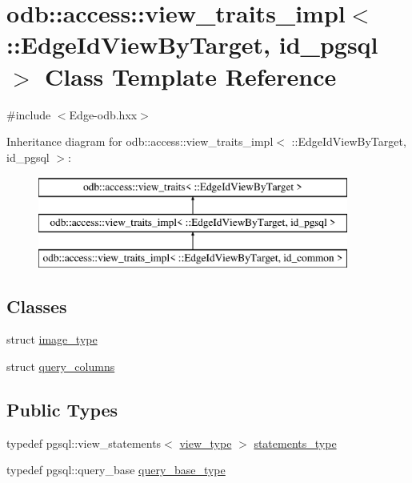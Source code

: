 \hypertarget{classodb_1_1access_1_1view__traits__impl_3_01_1_1_edge_id_view_by_target_00_01id__pgsql_01_4}{}\section{odb\+:\+:access\+:\+:view\+\_\+traits\+\_\+impl$<$ \+:\+:Edge\+Id\+View\+By\+Target, id\+\_\+pgsql $>$ Class Template Reference}
\label{classodb_1_1access_1_1view__traits__impl_3_01_1_1_edge_id_view_by_target_00_01id__pgsql_01_4}


{\ttfamily \#include $<$Edge-\/odb.\+hxx$>$}

Inheritance diagram for odb\+:\+:access\+:\+:view\+\_\+traits\+\_\+impl$<$ \+:\+:Edge\+Id\+View\+By\+Target, id\+\_\+pgsql $>$\+:\begin{figure}[H]
\begin{center}
\leavevmode
\includegraphics[height=3.000000cm]{d0/d63/classodb_1_1access_1_1view__traits__impl_3_01_1_1_edge_id_view_by_target_00_01id__pgsql_01_4}
\end{center}
\end{figure}
\subsection*{Classes}
\begin{DoxyCompactItemize}
\item 
struct \hyperlink{structodb_1_1access_1_1view__traits__impl_3_01_1_1_edge_id_view_by_target_00_01id__pgsql_01_4_1_1image__type}{image\+\_\+type}
\item 
struct \hyperlink{structodb_1_1access_1_1view__traits__impl_3_01_1_1_edge_id_view_by_target_00_01id__pgsql_01_4_1_1query__columns}{query\+\_\+columns}
\end{DoxyCompactItemize}
\subsection*{Public Types}
\begin{DoxyCompactItemize}
\item 
typedef pgsql\+::view\+\_\+statements$<$ \hyperlink{classodb_1_1access_1_1view__traits_3_01_1_1_edge_id_view_by_target_01_4_a9f04db81fe2177f9be477b512f390b40}{view\+\_\+type} $>$ \hyperlink{classodb_1_1access_1_1view__traits__impl_3_01_1_1_edge_id_view_by_target_00_01id__pgsql_01_4_a2bb409f4a06c6a8bb714bfd9001b6737}{statements\+\_\+type}
\item 
typedef pgsql\+::query\+\_\+base \hyperlink{classodb_1_1access_1_1view__traits__impl_3_01_1_1_edge_id_view_by_target_00_01id__pgsql_01_4_a44eb78f133d084693b0fa0aeef785887}{query\+\_\+base\+\_\+type}
\end{DoxyCompactItemize}
